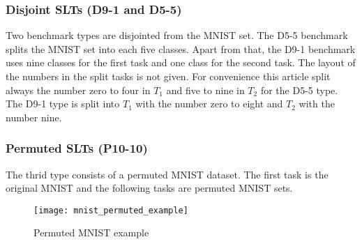 \subsubsection*{Disjoint SLTs (D9-1 and D5-5)}

Two benchmark types are disjointed from the MNIST set.
The D5-5 benchmark splits the MNIST set into each five classes.
Apart from that, the D9-1 benchmark uses nine classes for the first task and one class for the second task.
The layout of the numbers in the split tasks is not given.
For convenience this article split always the number zero to four in $T_1$ and five to nine in $T_2$ for the D5-5 type.
The D9-1 type is split into $T_1$ with the number zero to eight and $T_2$ with the number nine.

\subsubsection*{Permuted SLTs (P10-10)}

The thrid type consists of a permuted MNIST dataset.
The first task is the original MNIST and the following tasks are permuted MNIST sets.

\begin{figure}[H]
    \centering
    \texttt{[image: mnist\_permuted\_example]}
    \caption{Permuted MNIST example}
    \label{fig:intro_mnist_permuted_example}
\end{figure}
